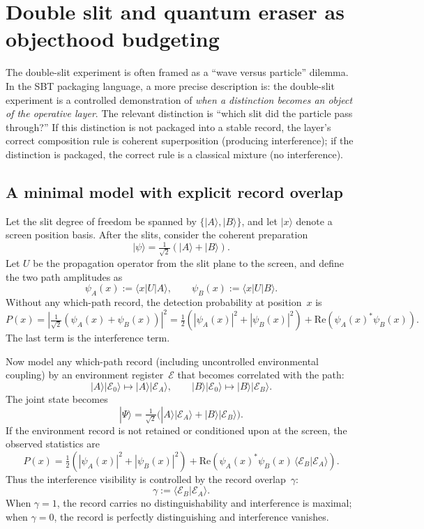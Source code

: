 \section{Double slit and quantum eraser as objecthood budgeting}\label{sec:doubleslit}

The double-slit experiment is often framed as a ``wave versus particle'' dilemma.
In the SBT packaging language, a more precise description is: the double-slit experiment is a controlled demonstration of \emph{when a distinction becomes an object of the operative layer}.
The relevant distinction is ``which slit did the particle pass through?''
If this distinction is not packaged into a stable record, the layer's correct composition rule is coherent superposition (producing interference);
if the distinction is packaged, the correct rule is a classical mixture (no interference).

\subsection{A minimal model with explicit record overlap}

Let the slit degree of freedom be spanned by $\{|A\rangle,|B\rangle\}$, and let $|x\rangle$ denote a screen position basis.
After the slits, consider the coherent preparation
\[
|\psi\rangle = \tfrac{1}{\sqrt2}\left(|A\rangle + |B\rangle\right).
\]
Let $U$ be the propagation operator from the slit plane to the screen, and define the two path amplitudes as
\[
\psi_A(x) := \langle x|U|A\rangle,\qquad \psi_B(x) := \langle x|U|B\rangle.
\]
Without any which-path record, the detection probability at position~$x$ is
\[
P(x) = \left|\tfrac{1}{\sqrt2}(\psi_A(x)+\psi_B(x))\right|^2
     = \tfrac12\left(|\psi_A(x)|^2+|\psi_B(x)|^2\right)
       + \mathrm{Re}\!\left(\psi_A(x)^\ast\psi_B(x)\right).
\]
The last term is the interference term.

Now model any which-path record (including uncontrolled environmental coupling) by an environment register~$\mathcal{E}$ that becomes correlated with the path:
\[
|A\rangle|\mathcal{E}_0\rangle \mapsto |A\rangle|\mathcal{E}_A\rangle,\qquad
|B\rangle|\mathcal{E}_0\rangle \mapsto |B\rangle|\mathcal{E}_B\rangle.
\]
The joint state becomes
\[
|\Psi\rangle=\tfrac{1}{\sqrt2}\big(|A\rangle|\mathcal{E}_A\rangle + |B\rangle|\mathcal{E}_B\rangle\big).
\]
If the environment record is not retained or conditioned upon at the screen, the observed statistics are
\[
P(x)=\tfrac12\left(|\psi_A(x)|^2+|\psi_B(x)|^2\right)
+\mathrm{Re}\!\left(\psi_A(x)^\ast\psi_B(x)\,\langle \mathcal{E}_B|\mathcal{E}_A\rangle\right).
\]
Thus the interference visibility is controlled by the record overlap~$\gamma$:\cite{Englert1996Visibility}
\[
\gamma := \langle \mathcal{E}_B|\mathcal{E}_A\rangle.
\]
When $\gamma=1$, the record carries no distinguishability and interference is maximal; when $\gamma=0$, the record is perfectly distinguishing and interference vanishes.

